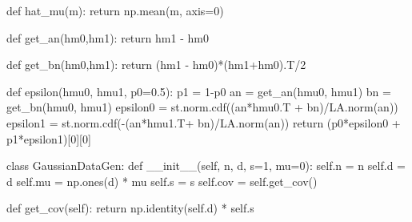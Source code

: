 \documentclass[
  letterpaper,
  DIV=11,
  numbers=noendperiod]{scrartcl}
\newenvironment{Shaded}{\begin{snugshade}}{\end{snugshade}}
\newcommand{\ControlFlowTok}[1]{\textcolor[rgb]{0.00,0.23,0.31}{#1}}
\newcommand{\DecValTok}[1]{\textcolor[rgb]{0.68,0.00,0.00}{#1}}
\newcommand{\FloatTok}[1]{\textcolor[rgb]{0.68,0.00,0.00}{#1}}
\newcommand{\FunctionTok}[1]{\textcolor[rgb]{0.28,0.35,0.67}{#1}}
\newcommand{\KeywordTok}[1]{\textcolor[rgb]{0.00,0.23,0.31}{#1}}
\newcommand{\NormalTok}[1]{\textcolor[rgb]{0.00,0.23,0.31}{#1}}
\newcommand{\OperatorTok}[1]{\textcolor[rgb]{0.37,0.37,0.37}{#1}}
\newcommand{\VariableTok}[1]{\textcolor[rgb]{0.07,0.07,0.07}{#1}}
\begin{document}
\begin{Shaded}
\begin{Highlighting}[numbers=left,,]
\KeywordTok{def}\NormalTok{ hat\_mu(m):}
    \ControlFlowTok{return}\NormalTok{ np.mean(m, axis}\OperatorTok{=}\DecValTok{0}\NormalTok{)}

\KeywordTok{def}\NormalTok{ get\_an(hm0,hm1):}
    \ControlFlowTok{return}\NormalTok{ hm1 }\OperatorTok{{-}}\NormalTok{ hm0}

\KeywordTok{def}\NormalTok{ get\_bn(hm0,hm1):}
    \ControlFlowTok{return}\NormalTok{ (hm1 }\OperatorTok{{-}}\NormalTok{ hm0)}\OperatorTok{*}\NormalTok{(hm1}\OperatorTok{+}\NormalTok{hm0).T}\OperatorTok{/}\DecValTok{2}

\KeywordTok{def}\NormalTok{ epsilon(hmu0, hmu1, p0}\OperatorTok{=}\FloatTok{0.5}\NormalTok{):}
\NormalTok{    p1 }\OperatorTok{=} \DecValTok{1}\OperatorTok{{-}}\NormalTok{p0}
\NormalTok{    an }\OperatorTok{=}\NormalTok{ get\_an(hmu0, hmu1)}
\NormalTok{    bn }\OperatorTok{=}\NormalTok{ get\_bn(hmu0, hmu1)}
\NormalTok{    epsilon0 }\OperatorTok{=}\NormalTok{ st.norm.cdf((an}\OperatorTok{*}\NormalTok{hmu0.T }\OperatorTok{+}\NormalTok{ bn)}\OperatorTok{/}\NormalTok{LA.norm(an))}
\NormalTok{    epsilon1 }\OperatorTok{=}\NormalTok{ st.norm.cdf(}\OperatorTok{{-}}\NormalTok{(an}\OperatorTok{*}\NormalTok{hmu1.T}\OperatorTok{+}\NormalTok{ bn)}\OperatorTok{/}\NormalTok{LA.norm(an))}
    \ControlFlowTok{return}\NormalTok{ (p0}\OperatorTok{*}\NormalTok{epsilon0 }\OperatorTok{+}\NormalTok{ p1}\OperatorTok{*}\NormalTok{epsilon1)[}\DecValTok{0}\NormalTok{][}\DecValTok{0}\NormalTok{]}

\KeywordTok{class}\NormalTok{ GaussianDataGen:}
    \KeywordTok{def} \FunctionTok{\_\_init\_\_}\NormalTok{(}\VariableTok{self}\NormalTok{, n, d, s}\OperatorTok{=}\DecValTok{1}\NormalTok{, mu}\OperatorTok{=}\DecValTok{0}\NormalTok{):}
        \VariableTok{self}\NormalTok{.n }\OperatorTok{=}\NormalTok{ n}
        \VariableTok{self}\NormalTok{.d }\OperatorTok{=}\NormalTok{ d}
        \VariableTok{self}\NormalTok{.mu }\OperatorTok{=}\NormalTok{ np.ones(d) }\OperatorTok{*}\NormalTok{ mu}
        \VariableTok{self}\NormalTok{.s }\OperatorTok{=}\NormalTok{ s}
        \VariableTok{self}\NormalTok{.cov }\OperatorTok{=} \VariableTok{self}\NormalTok{.get\_cov()}

    \KeywordTok{def}\NormalTok{ get\_cov(}\VariableTok{self}\NormalTok{):}
        \ControlFlowTok{return}\NormalTok{ np.identity(}\VariableTok{self}\NormalTok{.d) }\OperatorTok{*} \VariableTok{self}\NormalTok{.s}
    

\end{Highlighting}
\end{Shaded}
\end{document}
